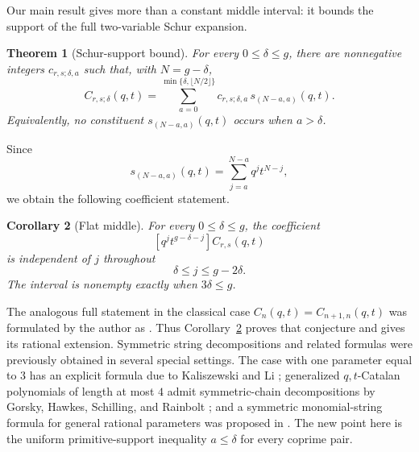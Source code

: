 \documentclass[11pt]{article}
\newtheorem{theorem}{Theorem}[section]
\newtheorem{corollary}[theorem]{Corollary}
\begin{document}
Our main result gives more than a constant middle interval: it bounds
the support of the full two-variable Schur expansion.

\begin{theorem}[Schur-support bound]\label{thm:main}
For every $0\leq\delta\leq g$, there are nonnegative integers
$c_{r,s;\delta,a}$ such that, with $N=g-\delta$,
\begin{equation}\label{eq:main-Schur}
 C_{r,s;\delta}(q,t)
 =\sum_{a=0}^{\min\{\delta,\lfloor N/2\rfloor\}}
 c_{r,s;\delta,a}\,s_{(N-a,a)}(q,t).
\end{equation}
Equivalently, no constituent $s_{(N-a,a)}(q,t)$ occurs when
$a>\delta$.
\end{theorem}

Since
\begin{equation}\label{eq:two-variable-Schur}
 s_{(N-a,a)}(q,t)
 =\sum_{j=a}^{N-a}q^jt^{N-j},
\end{equation}
we obtain the following coefficient statement.

\begin{corollary}[Flat middle]\label{cor:flat-middle}
For every $0\leq\delta\leq g$, the coefficient
\[
 [q^jt^{g-\delta-j}]C_{r,s}(q,t)
\]
is independent of $j$ throughout
\begin{equation}\label{eq:flat-interval}
 \delta\leq j\leq g-2\delta.
\end{equation}
The interval is nonempty exactly when $3\delta\leq g$.
\end{corollary}

The analogous full statement in the classical case
$C_n(q,t)=C_{n+1,n}(q,t)$ was formulated by the author as
\cite[Conjecture~5.38]{HawkesDyck}.  Thus
Corollary~\ref{cor:flat-middle} proves that conjecture and gives its
rational extension.  Symmetric string decompositions and related
formulas were previously obtained in several special settings.  The
case with one parameter equal to $3$ has an explicit formula due to
Kaliszewski and Li \cite{KaliszewskiLi}; generalized $q,t$-Catalan
polynomials of length at most $4$ admit symmetric-chain decompositions
by Gorsky, Hawkes, Schilling, and Rainbolt \cite{GHSR}; and a
symmetric monomial-string formula for general rational parameters was
proposed in \cite{HawkesRational}.  The new point here is the uniform
primitive-support inequality $a\leq\delta$ for every coprime pair.
\end{document}
